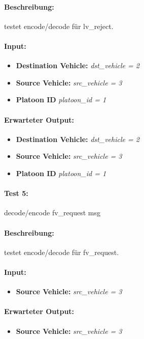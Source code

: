 \documentclass[a4paper, 12pt, titlepage]{scrartcl}
\begin{document}
{			\paragraph{Beschreibung:} testet encode/decode für lv\_reject.
			\paragraph{Input:}
			\begin{itemize} \itemsep-0.5em
				\item \textbf{Destination Vehicle:} \emph{dst\_vehicle = 2}
				\item \textbf{Source Vehicle:} \emph{src\_vehicle = 3}
				\item \textbf{Platoon ID} \emph{platoon\_id = 1}
			\end{itemize}
			\paragraph{Erwarteter Output:}
			\begin{itemize} \itemsep-0.5em
				\item \textbf{Destination Vehicle:} \emph{dst\_vehicle = 2}
				\item \textbf{Source Vehicle:} \emph{src\_vehicle = 3}
				\item \textbf{Platoon ID} \emph{platoon\_id = 1}
			\end{itemize}
			
			
			\paragraph{Test 5:}{decode/encode fv\_request msg}
			\paragraph{Beschreibung:} testet encode/decode für fv\_request.
			\paragraph{Input:}
			\begin{itemize} \itemsep-0.5em
				\item \textbf{Source Vehicle:} \emph{src\_vehicle = 3}
			\end{itemize}
			\paragraph{Erwarteter Output:}
			\begin{itemize} \itemsep-0.5em
				\item \textbf{Source Vehicle:} \emph{src\_vehicle = 3}
			\end{itemize}		

}
\end{document}
